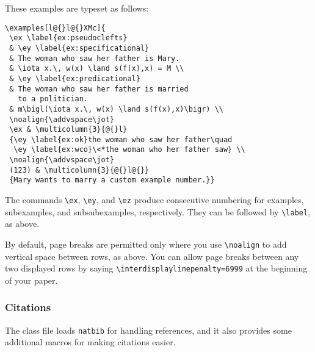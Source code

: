 \documentclass[lucida,final]{sp}
\newcommand{\spfile}[1]{\texttt{#1}}
\newcommand{\cmd}[1]{\texttt{\textbackslash#1}}
\begin{document}
\bigskip\noindent These examples are typeset as follows:
%
\begin{Verbatim}
\examples[l@{}l@{}XMc]{
 \ex \label{ex:pseudoclefts}
 & \ey \label{ex:specificational}
 & The woman who saw her father is Mary.
 & \iota x.\, w(x) \land s(f(x),x) = M \\
 & \ey \label{ex:predicational}
 & The woman who saw her father is married
   to a politician.
 & m\bigl(\iota x.\, w(x) \land s(f(x),x)\bigr) \\
 \noalign{\addvspace\jot}
 \ex & \multicolumn{3}{@{}l}
 {\ey \label{ex:ok}the woman who saw her father\quad
  \ey \label{ex:wco}\<*the woman who her father saw} \\
 \noalign{\addvspace\jot}
 (123) & \multicolumn{3}{@{}l@{}}
 {Mary wants to marry a custom example number.}}
\end{Verbatim}
%
The commands \cmd{ex}, \cmd{ey}, and \cmd{ez} produce consecutive
numbering for examples, subexamples, and subsubexamples, respectively.
They can be followed by \cmd{label}, as above.

By default, page breaks are permitted only where you use \cmd{noalign}
to add vertical space between rows, as above.  You can allow page
breaks between any two displayed rows by saying
\verb+\interdisplaylinepenalty=6999+ at the beginning of your paper.


\subsubsection{Citations}

The class file loads \spfile{natbib} for handling references, and it
also provides some additional macros for making citations easier.
\end{document}
